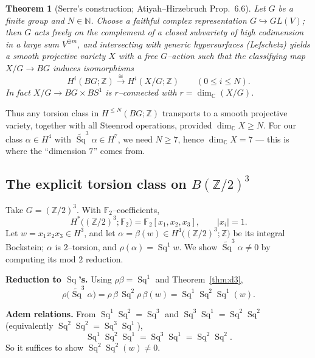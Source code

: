 \documentclass[11pt]{article}
\newtheorem{theorem}{Theorem}[section]
\theoremstyle{definition}
\DeclareMathOperator{\Sq}{Sq}
\newcommand{\Z}{\mathbb{Z}}
\newcommand{\C}{\mathbb{C}}
\newcommand{\F}{\mathbb{F}}
\begin{document}
\begin{theorem}[Serre's construction; Atiyah--Hirzebruch Prop.~6.6]\label{thm:GS}
Let $G$ be a finite group and $N\in\mathbb N$. Choose a faithful complex
representation $G\hookrightarrow GL(V)$; then $G$ acts freely on the complement of
a closed subvariety of high codimension in a large sum $V^{\oplus m}$, and
intersecting with generic hypersurfaces (Lefschetz) yields a smooth projective
variety $X$ with a free $G$--action such that the classifying map
$X/G\to BG$ induces isomorphisms
\[
  H^i(BG;\Z)\xrightarrow{\ \cong\ }H^i(X/G;\Z)\qquad(0\le i\le N).
\]
In fact $X/G\to BG\times BS^1$ is $r$--connected with $r=\dim_\C(X/G)$.
\end{theorem}

Thus any torsion class in $H^{\le N}(BG;\Z)$ transports to a smooth projective
variety, together with all Steenrod operations, provided $\dim_\C X\ge N$. For our
class $\alpha\in H^4$ with $\widetilde{\Sq}^3\alpha\in H^7$, we need $N\ge 7$,
hence $\dim_\C X=7$ --- this is where the ``dimension $7$'' comes from.

\subsection{The explicit torsion class on $B(\Z/2)^3$}

Take $G=(\Z/2)^3$. With $\F_2$--coefficients,
\[
  H^*\!\big((\Z/2)^3;\F_2\big)=\F_2[x_1,x_2,x_3],\qquad |x_i|=1 .
\]
Let $w=x_1x_2x_3\in H^3$, and let $\alpha=\beta(w)\in H^4\big((\Z/2)^3;\Z\big)$ be
its integral Bockstein; $\alpha$ is $2$--torsion, and $\rho(\alpha)=\Sq^1 w$. We
show $\widetilde{\Sq}^3\alpha\neq 0$ by computing its mod $2$ reduction.

\smallskip\noindent\textbf{Reduction to $\Sq$'s.} Using $\rho\beta=\Sq^1$ and
Theorem~\ref{thm:d3},
\[
  \rho\big(\widetilde{\Sq}^3\alpha\big)
  =\rho\,\beta\,\Sq^2\rho\,\beta(w)
  =\Sq^1\Sq^2\Sq^1(w).
\]

\smallskip\noindent\textbf{Adem relations.} From $\Sq^1\Sq^2=\Sq^3$ and
$\Sq^3\Sq^1=\Sq^2\Sq^2$ (equivalently $\Sq^2\Sq^2=\Sq^3\Sq^1$),
\[
  \Sq^1\Sq^2\Sq^1=\Sq^3\Sq^1=\Sq^2\Sq^2 .
\]
So it suffices to show $\Sq^2\Sq^2(w)\neq 0$.
\end{document}

